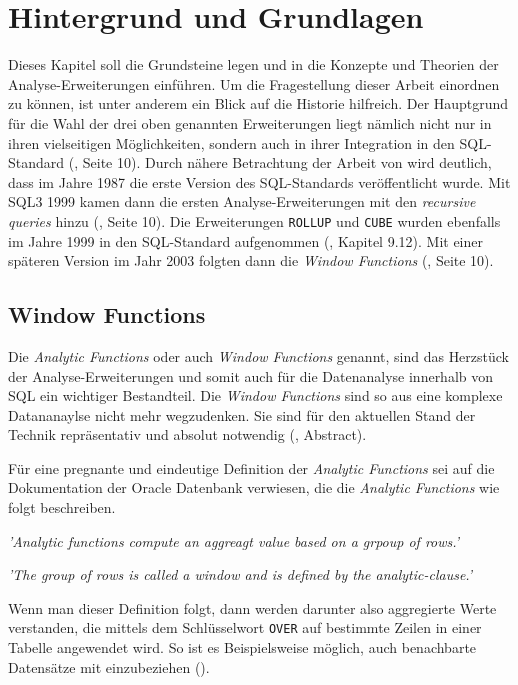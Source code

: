 \chapter{Hintergrund und Grundlagen}
Dieses Kapitel soll die Grundsteine legen und in die Konzepte und Theorien der Analyse-Erweiterungen
einführen. Um die Fragestellung dieser Arbeit einordnen zu können, ist unter anderem
ein Blick auf die Historie hilfreich. Der Hauptgrund für die Wahl der drei oben
genannten Erweiterungen liegt nämlich nicht nur in ihren vielseitigen
Möglichkeiten, sondern auch in ihrer Integration in den SQL-Standard (\cite{grust2017advanced},
Seite 10). Durch nähere Betrachtung der Arbeit von \cite{grust2017advanced} wird
deutlich, dass im Jahre 1987 die erste Version des SQL-Standards veröffentlicht
wurde. Mit SQL3 1999 kamen dann die ersten Analyse-Erweiterungen mit den \textit{recursive
queries} hinzu (\cite{grust2017advanced}, Seite 10). Die Erweiterungen \texttt{ROLLUP}
und \texttt{CUBE} wurden ebenfalls im Jahre 1999 in den SQL-Standard aufgenommen
(\cite{melton2001sql}, Kapitel 9.12). Mit einer späteren Version im Jahr 2003
folgten dann die \textit{Window Functions} (\cite{grust2017advanced}, Seite 10).

\section{Window Functions}
Die \textit{Analytic Functions} oder auch \textit{Window Functions} genannt, sind
das Herzstück der Analyse-Erweiterungen und somit auch für die Datenanalyse innerhalb
von SQL ein wichtiger Bestandteil. Die \textit{Window Functions} sind so aus eine
komplexe Datananaylse nicht mehr wegzudenken. Sie sind für den aktuellen Stand
der Technik repräsentativ und absolut notwendig (\cite{cao2012optimization},
Abstract).

Für eine pregnante und eindeutige Definition der \textit{Analytic Functions} sei
auf die Dokumentation der Oracle Datenbank verwiesen, die die \textit{Analytic
Functions} wie folgt beschreiben.
\begin{center}
	\textit{ 'Analytic functions compute an aggreagt value based on a grpoup of
	rows.' } \\ \cite{oracle}

	\textit{ 'The group of rows is called a window and is defined by the analytic-clause.'
	} \\ \cite{oracle}
\end{center}
Wenn man dieser Definition folgt, dann werden darunter also aggregierte Werte
verstanden, die mittels dem Schlüsselwort \texttt{OVER} auf bestimmte Zeilen in
einer Tabelle angewendet wird. So ist es Beispielsweise möglich, auch
benachbarte Datensätze mit einzubeziehen (\cite{oracle}).

